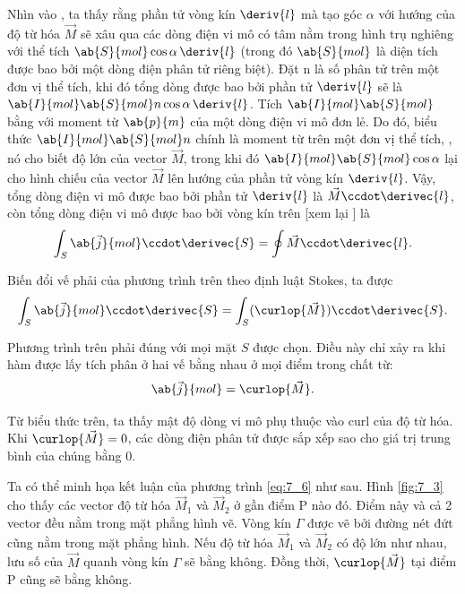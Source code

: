 Nhìn vào , ta thấy rằng phần tử vòng kín $\deriv{l}$ mà tạo góc $\alpha$ với hướng của độ từ hóa $\vec{M}$ sẽ xâu qua các dòng điện vi mô có tâm nằm trong hình trụ nghiêng với thể tích $\ab{S}{mol} \cos\alpha\,\deriv{l}$ (trong đó $\ab{S}{mol}$ là diện tích được bao bởi một dòng điện phân tử riêng biệt).
Đặt n là số phân tử trên một đơn vị thể tích, khi đó tổng dòng được bao bởi phần tử $\deriv{l}$ sẽ là $\ab{I}{mol} \ab{S}{mol} n \cos\alpha\, \deriv{l}$.
Tích $\ab{I}{mol}\ab{S}{mol}$ bằng với moment từ $\ab{p}{m}$ của một dòng điện vi mô đơn lẻ.
Do đó, biểu thức $\ab{I}{mol}\ab{S}{mol}n$ chính là moment từ trên một đơn vị thể tích, \ie, nó cho biết độ lớn của vector $\vec{M}$, trong khi đó $\ab{I}{mol}\ab{S}{mol}\cos\alpha$ lại cho hình chiếu của vector $\vec{M}$ lên hướng của phần tử vòng kín $\deriv{l}$.
Vậy, tổng dòng điện vi mô được bao bởi phần tử $\deriv{l}$ là $\vec{M}\ccdot\derivec{l}$, còn tổng dòng điện vi mô được bao bởi vòng kín trên [xem lại ] là
\begin{equation*}
    \int_S \ab{\vec{j}}{mol} \ccdot \derivec{S} = \oint \vec{M} \ccdot \derivec{l}.
\end{equation*}

\noindent
Biến đổi vế phải của phương trình trên theo định luật Stokes, ta được
\begin{equation*}
    \int_S \ab{\vec{j}}{mol} \ccdot \derivec{S} = \int_S (\curlop{\vec{M}}) \ccdot \derivec{S}.
\end{equation*}

\noindent
Phương trình trên phải đúng với mọi mặt $S$ được chọn.
Điều này chỉ xảy ra khi hàm được lấy tích phân ở hai vế bằng nhau ở mọi điểm trong chất từ:
\begin{equation}\label{eq:7_6}
    \ab{\vec{j}}{mol} = \curlop{\vec{M}}.
\end{equation}

\noindent
Từ biểu thức trên, ta thấy mật độ dòng vi mô phụ thuộc vào curl của độ từ hóa. Khi $\curlop{\vec{M}}=0$, các dòng điện phân tử được sắp xếp sao cho giá trị trung bình của chúng bằng 0.

Ta có thể minh họa kết luận của phương trình \eqref{eq:7_6} như sau.
Hình \ref{fig:7_3} cho thấy các vector độ từ hóa $\vec{M}_1$ và $\vec{M}_2$ ở gần điểm P nào đó. Điểm này và cả 2 vector đều nằm trong mặt phẳng hình vẽ.
Vòng kín $\Gamma$ được vẽ bởi đường nét đứt cũng nằm trong mặt phẳng hình.
Nếu độ từ hóa $\vec{M}_1$ và $\vec{M}_2$ có độ lớn như nhau, lưu số của $\vec{M}$ quanh vòng kín $\Gamma$ sẽ bằng không.
Đồng thời, $\curlop{\vec{M}}$ tại điểm P cũng sẽ bằng không.

